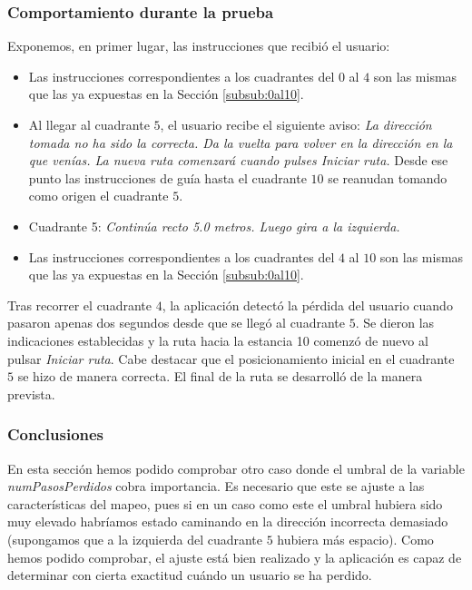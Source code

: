 \subsubsection*{Comportamiento durante la prueba}

Exponemos, en primer lugar, las instrucciones que recibió el usuario:

\begin{itemize}
	\item Las instrucciones correspondientes a los cuadrantes del $0$ al $4$ son las mismas que las ya expuestas en la Sección \ref{subsub:0al10}. 
	
	\item Al llegar al cuadrante $5$, el usuario recibe el siguiente aviso: \textit{La dirección tomada no ha sido la correcta. Da la vuelta para volver en la dirección en la que venías. La nueva ruta comenzará cuando pulses Iniciar ruta.} Desde ese punto las instrucciones de guía hasta el cuadrante $10$ se reanudan tomando como origen el cuadrante $5$. 
	
	\item Cuadrante 5: \textit{Continúa recto 5.0 metros. Luego gira a la izquierda.}
	
	\item Las instrucciones correspondientes a los cuadrantes del $4$ al $10$ son las mismas que las ya expuestas en la Sección \ref{subsub:0al10}.
\end{itemize}

Tras recorrer el cuadrante $4$, la aplicación detectó la pérdida del usuario cuando pasaron apenas dos segundos desde que se llegó al cuadrante $5$. Se dieron las indicaciones establecidas y la ruta hacia la estancia 10 comenzó de nuevo al pulsar \textit{Iniciar ruta}. Cabe destacar que el posicionamiento inicial en el cuadrante $5$ se hizo de manera correcta. El final de la ruta se desarrolló de la manera prevista.

\subsubsection*{Conclusiones}

En esta sección hemos podido comprobar otro caso donde el umbral de la variable \textit{numPasosPerdidos} cobra importancia. Es necesario que este se ajuste a las características del mapeo, pues si en un caso como este el umbral hubiera sido muy elevado habríamos estado caminando en la dirección incorrecta demasiado (supongamos que a la izquierda del cuadrante $5$ hubiera más espacio). Como hemos podido comprobar, el ajuste está bien realizado y la aplicación es capaz de determinar con cierta exactitud cuándo un usuario se ha perdido.


